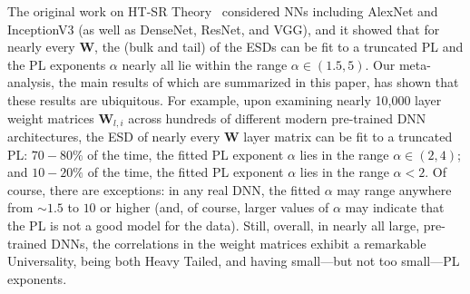 The original work on HT-SR Theory~\cite{MM18_TR,MM19_HTSR_ICML,MM20_SDM} considered NNs including AlexNet and InceptionV3 (as well as DenseNet, ResNet, and VGG), and it showed that for nearly every $\mathbf{W}$, the (bulk and tail) of the ESDs can be fit to a truncated PL and the PL exponents $\alpha$ nearly all lie within the range $\alpha\in(1.5,5)$.
Our meta-analysis, the main results of which are summarized in this paper, has shown that these results are ubiquitous.
For example, 
upon examining nearly 10,000 layer weight matrices $\mathbf{W}_{l,i}$ across hundreds of different modern pre-trained DNN architectures, the ESD of nearly every $\mathbf{W}$ layer matrix can be fit to a truncated PL:
$70-80\%$ of the time, the fitted PL exponent $\alpha$ lies in the range $\alpha\in(2,4)$; and  
$10-20\%$ of the time, the fitted PL exponent $\alpha$ lies in the range $\alpha< 2$.  
Of course, there are exceptions: in any real DNN, the fitted $\alpha$ may range anywhere from $\sim 1.5$ to $10$ or higher (and, of course, larger values of $\alpha$ may indicate that the PL is not a good model for the data).  
Still, overall, in nearly all large, pre-trained DNNs, the correlations in the  weight matrices exhibit a remarkable Universality, being both Heavy Tailed, and having small---but not too small---PL exponents. 

